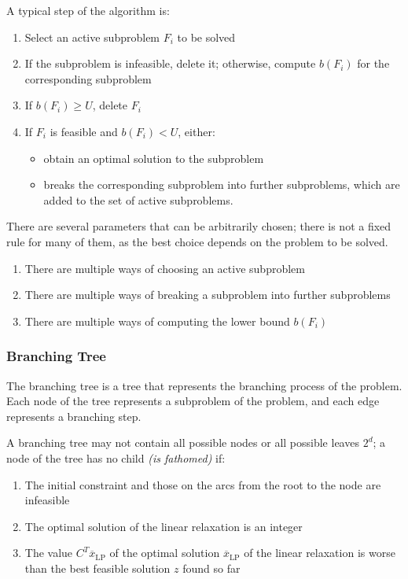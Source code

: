 \documentclass[english]{article}
\begin{document}
A typical step of the algorithm is:

\begin{enumerate}
  \item Select an active subproblem \(F_i\) to be solved
  \item If the subproblem is infeasible, delete it; otherwise, compute \(b(F_i)\) for the corresponding subproblem
  \item If \(b(F_i) \geq U\), delete \(F_i\)
  \item If \(F_i\) is feasible and \(b(F_i) < U\), either:
        \begin{itemize}
          \item obtain an optimal solution to the subproblem
          \item breaks the corresponding subproblem into further subproblems, which are added to the set of active subproblems.
        \end{itemize}
\end{enumerate}

\bigskip
There are several parameters that can be arbitrarily chosen;
there is not a fixed rule for many of them, as the best choice depends on the problem to be solved.

\begin{enumerate}
  \item There are multiple ways of choosing an active subproblem
  \item There are multiple ways of breaking a subproblem into further subproblems
  \item There are multiple ways of computing the lower bound \(b(F_i)\)
\end{enumerate}

\subsubsection{Branching Tree}

The branching tree is a tree that represents the branching process of the \ILP problem.
Each node of the tree represents a subproblem of the \ILP problem, and each edge represents a branching step.

A branching tree may not contain all possible nodes or all possible leaves \(2^d\);
a node of the tree has no child \textit{(is fathomed)} if:

\begin{enumerate}
  \item The initial constraint and those on the arcs from the root to the node are infeasible
  \item The optimal solution of the linear relaxation is an integer
  \item The value \(C^T \overline{x}_{\text{LP}}\) of the optimal solution \(\overline{x}_{\text{LP}}\) of the linear relaxation is worse than the best feasible solution \(z\) found so far
\end{enumerate}
\end{document}

